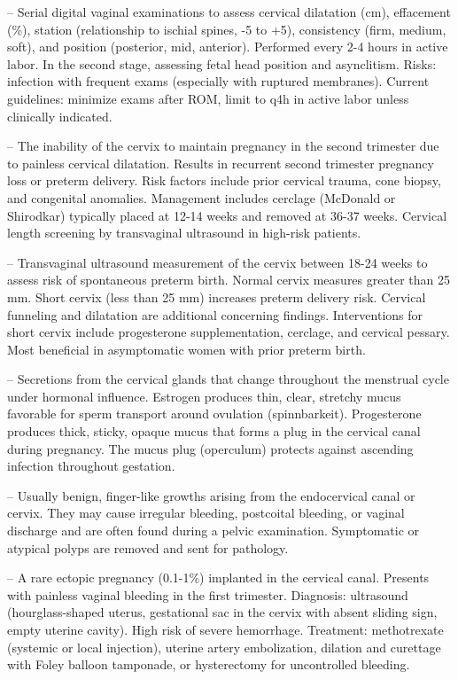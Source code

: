 -- Serial digital vaginal examinations to assess cervical dilatation (cm), effacement (\%), station (relationship to ischial spines, -5 to +5), consistency (firm, medium, soft), and position (posterior, mid, anterior). Performed every 2-4 hours in active labor. In the second stage, assessing fetal head position and asynclitism. Risks: infection with frequent exams (especially with ruptured membranes). Current guidelines: minimize exams after ROM, limit to q4h in active labor unless clinically indicated.

-- The inability of the cervix to maintain pregnancy in the second trimester due to painless cervical dilatation. Results in recurrent second trimester pregnancy loss or preterm delivery. Risk factors include prior cervical trauma, cone biopsy, and congenital anomalies. Management includes cerclage (McDonald or Shirodkar) typically placed at 12-14 weeks and removed at 36-37 weeks. Cervical length screening by transvaginal ultrasound in high-risk patients.

-- Transvaginal ultrasound measurement of the cervix between 18-24 weeks to assess risk of spontaneous preterm birth. Normal cervix measures greater than 25 mm. Short cervix (less than 25 mm) increases preterm delivery risk. Cervical funneling and dilatation are additional concerning findings. Interventions for short cervix include progesterone supplementation, cerclage, and cervical pessary. Most beneficial in asymptomatic women with prior preterm birth.

-- Secretions from the cervical glands that change throughout the menstrual cycle under hormonal influence. Estrogen produces thin, clear, stretchy mucus favorable for sperm transport around ovulation (spinnbarkeit). Progesterone produces thick, sticky, opaque mucus that forms a plug in the cervical canal during pregnancy. The mucus plug (operculum) protects against ascending infection throughout gestation.

-- Usually benign, finger-like growths arising from the endocervical canal or cervix. They may cause irregular bleeding, postcoital bleeding, or vaginal discharge and are often found during a pelvic examination. Symptomatic or atypical polyps are removed and sent for pathology.

-- A rare ectopic pregnancy (0.1-1\%) implanted in the cervical canal. Presents with painless vaginal bleeding in the first trimester. Diagnosis: ultrasound (hourglass-shaped uterus, gestational sac in the cervix with absent sliding sign, empty uterine cavity). High risk of severe hemorrhage. Treatment: methotrexate (systemic or local injection), uterine artery embolization, dilation and curettage with Foley balloon tamponade, or hysterectomy for uncontrolled bleeding.

